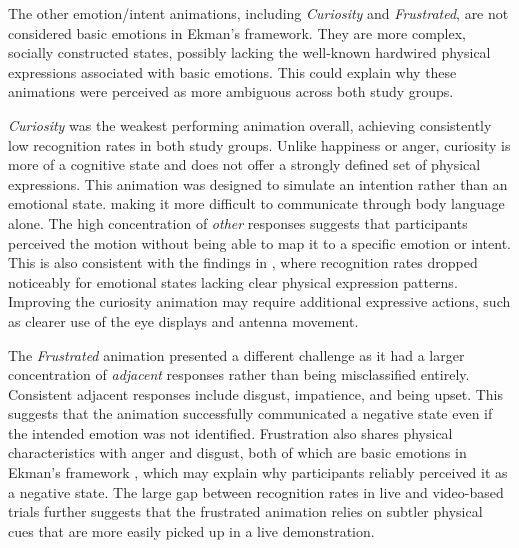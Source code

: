 The other emotion/intent animations, including \textit{Curiosity} and \textit{Frustrated}, are not considered basic emotions in Ekman's framework. They are more complex, socially constructed states, possibly lacking the well-known hardwired physical expressions associated with basic emotions. This could explain why these animations were perceived as more ambiguous across both study groups. 

\textit{Curiosity} was the weakest performing animation overall, achieving consistently low recognition rates in both study groups. Unlike happiness or anger, curiosity is more of a cognitive state and does not offer a strongly defined set of physical expressions. This animation was designed to simulate an intention rather than an emotional state. making it more difficult to communicate through body language alone. The high concentration of \textit{other} responses suggests that participants perceived the motion without being able to map it to a specific emotion or intent. This is also consistent with the findings in \cite{beck_interpretation_2010}, where recognition rates dropped noticeably for emotional states lacking clear physical expression patterns. Improving the curiosity animation may require additional expressive actions, such as clearer use of the eye displays and antenna movement. 

The \textit{Frustrated} animation presented a different challenge as it had a larger concentration of \textit{adjacent} responses rather than being misclassified entirely. Consistent adjacent responses include disgust, impatience, and being upset. This suggests that the animation successfully communicated a negative state even if the intended emotion was not identified. Frustration also shares physical characteristics with anger and disgust, both of which are basic emotions in Ekman's framework \cite{ekman_basic_1999}, which may explain why participants reliably perceived it as a negative state. The large gap between recognition rates in live and video-based trials further suggests that the frustrated animation relies on subtler physical cues that are more easily picked up in a live demonstration.

